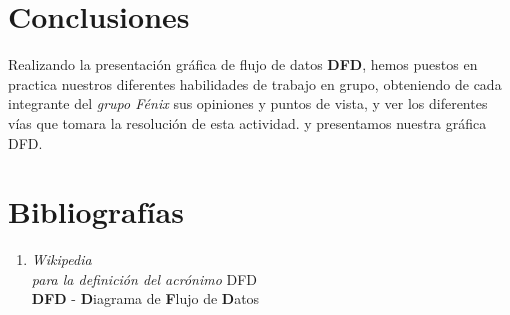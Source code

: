 \documentclass[12pt]{article}
\begin{document}
\section{ Conclusiones }
\vspace{1cm}

\begin{center}
\begin{minipage}{12cm}
  Realizando la presentación gráfica de flujo de datos \textbf{DFD},
  hemos puestos en practica nuestros diferentes habilidades de trabajo
  en grupo, obteniendo de cada integrante del \textit{grupo Fénix} sus
  opiniones y puntos de vista, y ver los diferentes vías que tomara 
  la resolución de esta actividad. y presentamos nuestra gráfica DFD.
\end{minipage}
\end{center}


\newpage
\section{ Bibliografías }
\begin{enumerate}
  \item \textit{Wikipedia}\\
    \textit{para la definición del acrónimo} DFD\\
    \textbf{DFD} - {\bf D}iagrama de {\bf F}lujo de {\bf D}atos

\end{enumerate}
\end{document}

